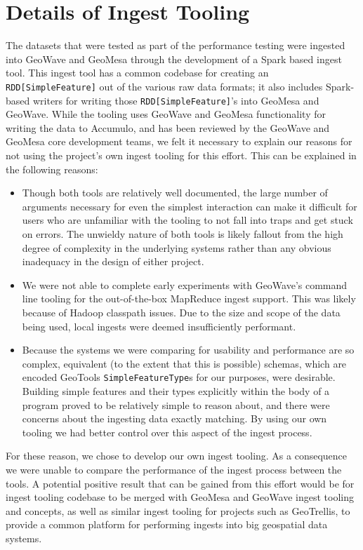 \section{Details of Ingest Tooling}
\label{appendix:ingest}

The datasets that were tested as part of the performance testing were ingested into GeoWave and GeoMesa through the development of a Spark based ingest tool.
This ingest tool has a common codebase for creating an \texttt{RDD[SimpleFeature]} out of the various raw data formats; it also includes Spark-based writers for writing those \texttt{RDD[SimpleFeature]}'s into GeoMesa and GeoWave.
While the tooling uses GeoWave and GeoMesa functionality for writing the data to Accumulo, and has been reviewed by the GeoWave and GeoMesa core development teams, we felt it necessary to explain our reasons for not using the project's own ingest tooling for this effort.
This can be explained in the following reasons:

\begin{itemize}
\item{
  Though both tools are relatively well documented, the large number of arguments necessary for even the simplest interaction can make it difficult for users who are unfamiliar with the tooling to not fall into traps and get stuck on errors.
  The unwieldy nature of both tools is likely fallout from the high degree of complexity in the underlying systems rather than any obvious inadequacy in the design of either project.
}
\item{
  We were not able to complete early experiments with GeoWave’s command line tooling for the out-of-the-box MapReduce ingest support.
  This was likely because of Hadoop classpath issues.
  Due to the size and scope of the data being used, local ingests were deemed insufficiently performant.
}
\item{
  Because the systems we were comparing for usability and performance are so complex, equivalent (to the extent that this is possible) schemas, which are encoded GeoTools \texttt{SimpleFeatureType}s for our purposes, were desirable.
  Building simple features and their types explicitly within the body of a program proved to be relatively simple to reason about, and there were concerns about the ingesting data exactly matching.
  By using our own tooling we had better control over this aspect of the ingest process.
}
\end{itemize}

For these reason, we chose to develop our own ingest tooling.
As a consequence we were unable to compare the performance of the ingest process between the tools.
A potential positive result that can be gained from this effort would be for ingest tooling codebase to be merged with GeoMesa and GeoWave ingest tooling and concepts, as well as similar ingest tooling for projects such as GeoTrellis,
to provide a common platform for performing ingests into big geospatial data systems.
